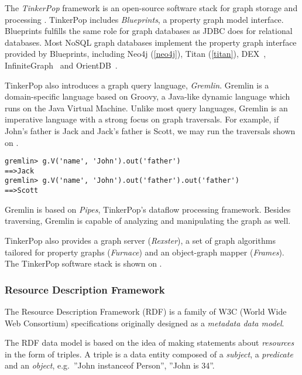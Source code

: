 
The \emph{TinkerPop} framework is an open-source software stack for graph storage and processing \cite{TinkerPop}. TinkerPop includes \emph{Blueprints}, a property graph model interface. Blueprints fulfills the same role for graph databases as JDBC does for relational databases. Most NoSQL graph databases implement the property graph interface provided by Blueprints, including Neo4j (\autoref{neo4j}), Titan (\autoref{titan}), DEX~\cite{DEX}, InfiniteGraph~\cite{InfiniteGraph} and OrientDB~\cite{OrientDB}.

TinkerPop also introduces a graph query language, \textit{Gremlin}. Gremlin is a domain-specific language based on Groovy, a Java-like dynamic language which runs on the Java Virtual Machine. Unlike most query languages, Gremlin is an imperative language with a strong focus on graph traversals. For example, if John's father is Jack and Jack's father is Scott, we may run the traversals shown on .

\begin{lstlisting}[caption=Simple Gremlin queries, label=lst:gremlin-queries]
gremlin> g.V('name', 'John').out('father')
==>Jack
gremlin> g.V('name', 'John').out('father').out('father')
==>Scott
\end{lstlisting}

Gremlin is based on \textit{Pipes}, TinkerPop's dataflow processing framework. Besides traversing, Gremlin is capable of analyzing and manipulating the graph as well.

TinkerPop also provides a graph server (\textit{Rexster}), a set of graph algorithms tailored for property graphs (\textit{Furnace}) and an object-graph mapper (\textit{Frames}). The TinkerPop software stack is shown on .

\subsubsection{Resource Description Framework}

The Resource Description Framework (RDF) is a family of W3C (World Wide Web Consortium) specifications originally designed as a \emph{metadata data model}. 

The RDF data model is based on the idea of making statements about \emph{resources} in the form of triples. A triple is a data entity composed of a \emph{subject}, a \emph{predicate} and an \emph{object}, e.g.\ ''John instanceof Person'', ''John is 34''.  

